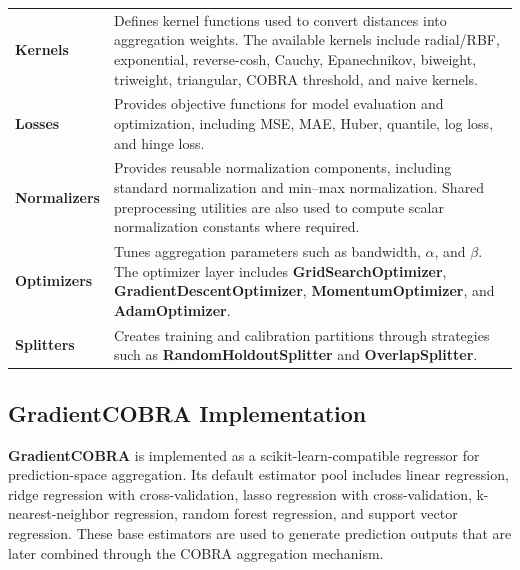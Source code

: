 \begin{table}[H]
\begin{tabularx}{\textwidth}{lX}
            \textbf{Kernels}          &
            Defines kernel functions used to convert distances into aggregation weights. The available kernels include radial/RBF, exponential, reverse-cosh, Cauchy, Epanechnikov, biweight, triweight, triangular, COBRA threshold, and naive kernels.                                \\

            \textbf{Losses}           &
            Provides objective functions for model evaluation and optimization, including MSE, MAE, Huber, quantile, log loss, and hinge loss.                                                                                                                                          \\

            \textbf{Normalizers}      &
            Provides reusable normalization components, including standard normalization and min--max normalization. Shared preprocessing utilities are also used to compute scalar normalization constants where required.                                                             \\

            \textbf{Optimizers}       &
            Tunes aggregation parameters such as bandwidth, $\alpha$, and $\beta$. The optimizer layer includes \textbf{GridSearchOptimizer}, \textbf{GradientDescentOptimizer}, \textbf{MomentumOptimizer}, and \textbf{AdamOptimizer}.                                                \\

            \textbf{Splitters}        &
            Creates training and calibration partitions through strategies such as \textbf{RandomHoldoutSplitter} and \textbf{OverlapSplitter}.                                                                                                                                         \\
            \bottomrule
      \end{tabularx}
\end{table}


\subsection{GradientCOBRA Implementation}

\hs\textbf{GradientCOBRA} is implemented as a scikit-learn-compatible regressor for prediction-space aggregation. Its default estimator pool includes linear regression, ridge regression with cross-validation, lasso regression with cross-validation, k-nearest-neighbor regression, random forest regression, and support vector regression. These base estimators are used to generate prediction outputs that are later combined through the COBRA aggregation mechanism.

